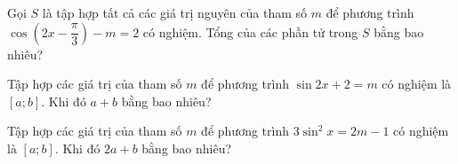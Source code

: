 
\begin{ex}%
	Gọi $S$ là tập hợp tất cả các giá trị nguyên của  tham số $m$ để phương trình \break $\cos\left(2x-\dfrac{\pi}{3}\right)-m=2$ có nghiệm. Tổng của các phần tử trong $S$ bằng bao nhiêu?
\end{ex}

\begin{ex}%
	Tập hợp các giá trị của tham số $m$ để phương trình $\sin 2x+2=m$ có nghiệm là $\left[a;b\right]$. Khi đó $a+b$ bằng bao  nhiêu?
\end{ex}

\begin{ex}%
	Tập hợp các giá trị của tham số $m$ để  phương trình $3\sin^2x=2m-1$ có nghiệm là $\left[a;b\right]$. Khi đó $2a+b$ bằng bao nhiêu?
\end{ex}



